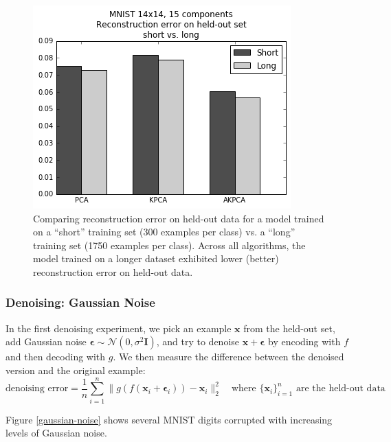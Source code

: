 \documentclass[]{article}
\begin{document}
\begin{figure}[h]
\center
\includegraphics[scale=0.5]{figures/mnist_14_testing_short_long}
\caption{Comparing reconstruction error on held-out data for a model trained on a ``short'' training set (300 examples per class) vs. a ``long'' training set (1750 examples per class).  Across all algorithms, the model trained on a longer dataset exhibited lower (better) reconstruction error on held-out data.}
\label{short-vs-long}
\end{figure}

\subsubsection{Denoising: Gaussian Noise}

In the first denoising experiment, we pick an example $\mathbf{x}$ from the held-out set, add Gaussian noise $\boldsymbol{\epsilon} \sim \mathcal{N}(0, \sigma^2 \mathbf{I})$, and try to denoise $\mathbf{x} + \boldsymbol{\epsilon}$ by encoding with $f$ and then decoding with $g$.
We then measure the difference between the denoised version and the original example:
$$ \text{denoising error} = \frac{1}{n} \sum_{i = 1}^n \| g(f(\mathbf{x}_i + \boldsymbol{\epsilon}_i)) - \mathbf{x}_i  \|^2_2 \quad \text{where } \{ \mathbf{x}_i \}_{i=1}^n \text{ are the held-out data}$$

Figure \ref{gaussian-noise} shows several MNIST digits corrupted with increasing levels of Gaussian noise.
\end{document}
